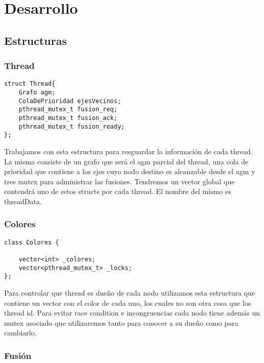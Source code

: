 \section{Desarrollo}

\subsection{Estructuras}

\subsubsection{Thread}
\begin{verbatim}
struct Thread{
    Grafo agm;
    ColaDePrioridad ejesVecinos;
    pthread_mutex_t fusion_req;   
    pthread_mutex_t fusion_ack;   
    pthread_mutex_t fusion_ready; 
};
\end{verbatim}

 Trabajamos con esta estructura para resguardar la información de cada thread. La misma consiste de un grafo que será el agm parcial del thread, una cola de prioridad que contiene a los ejes cuyo nodo destino es alcanzable desde el agm y tres mutex para administrar las fusiones. Tendremos un vector global que contendrá uno de estos structs por cada thread. El nombre del mismo es threadData.



\subsubsection{Colores}
\begin{verbatim}
class Colores {

    vector<int> _colores;
    vector<pthread_mutex_t> _locks;
};
\end{verbatim}
Para controlar que thread es dueño de cada nodo utilizamos esta estructura que contiene un vector con el color de cada uno, los cuales no son otra cosa que los thread id. Para evitar race condition e incongruencias cada nodo tiene además un mutex asociado que utilizaremos tanto para conocer a su dueño como para cambiarlo. 

\subsubsection{Fusión}

